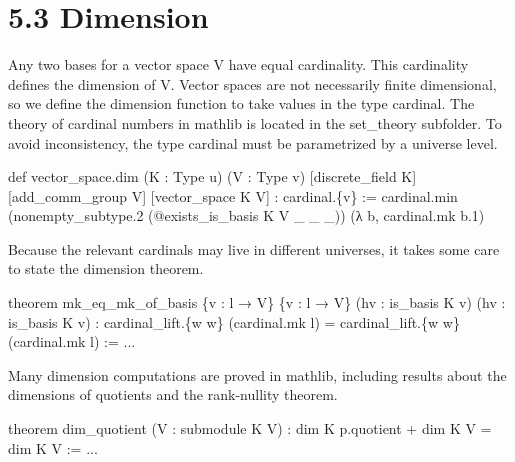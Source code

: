 \documentclass[
]{article}
\newenvironment{Shaded}{}{}
\newcommand{\NormalTok}[1]{#1}
\newcounter{none} %
\begin{document}
\section{5.3 Dimension}\label{dimension}

Any two bases for a vector space V have equal cardinality. This
cardinality defines the dimension of V. Vector spaces are not
necessarily finite dimensional, so we define the dimension function to
take values in the type cardinal. The theory of cardinal numbers in
mathlib is located in the set\_theory subfolder. To avoid inconsistency,
the type cardinal must be parametrized by a universe level.

\begin{Shaded}
\begin{Highlighting}[]
\NormalTok{def vector\_space.dim (K : Type u) (V : Type v)}
\NormalTok{    [discrete\_field K] [add\_comm\_group V]}
\NormalTok{    [vector\_space K V] : cardinal.\{v\} :=}
\NormalTok{cardinal.min (nonempty\_subtype.2}
\NormalTok{(@exists\_is\_basis K V \_ \_ \_))}
\NormalTok{(λ b, cardinal.mk b.1) }
\end{Highlighting}
\end{Shaded}

Because the relevant cardinals may live in different universes, it takes
some care to state the dimension theorem.

\begin{Shaded}
\begin{Highlighting}[]
\NormalTok{theorem mk\_eq\_mk\_of\_basis}
\NormalTok{\{v : l → V\} \{v\textquotesingle{} : l\textquotesingle{} → V\}}
\NormalTok{(hv : is\_basis K v) (hv\textquotesingle{} : is\_basis K v\textquotesingle{}) :}
\NormalTok{cardinal\_lift.\{w w\textquotesingle{}\} (cardinal.mk l) =}
\NormalTok{cardinal\_lift.\{w\textquotesingle{} w\} (cardinal.mk l\textquotesingle{}) := ... }
\end{Highlighting}
\end{Shaded}

Many dimension computations are proved in mathlib, including results
about the dimensions of quotients and the rank-nullity theorem.

\begin{Shaded}
\begin{Highlighting}[]
\NormalTok{theorem dim\_quotient (V\textquotesingle{} : submodule K V) :}
\NormalTok{dim K p.quotient + dim K V\textquotesingle{} = dim K V := ... }
\end{Highlighting}
\end{Shaded}
\end{document}
